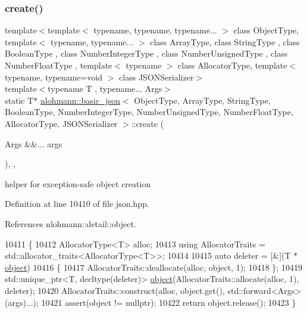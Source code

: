 \subsubsection{\texorpdfstring{create()}{create()}}
{\footnotesize\ttfamily template$<$template$<$ typename, typename, typename... $>$ class Object\+Type, template$<$ typename, typename... $>$ class Array\+Type, class String\+Type , class Boolean\+Type , class Number\+Integer\+Type , class Number\+Unsigned\+Type , class Number\+Float\+Type , template$<$ typename $>$ class Allocator\+Type, template$<$ typename, typename=void $>$ class J\+S\+O\+N\+Serializer$>$ \\
template$<$typename T , typename... Args$>$ \\
static T$\ast$ \hyperlink{classnlohmann_1_1basic__json}{nlohmann\+::basic\+\_\+json}$<$ Object\+Type, Array\+Type, String\+Type, Boolean\+Type, Number\+Integer\+Type, Number\+Unsigned\+Type, Number\+Float\+Type, Allocator\+Type, J\+S\+O\+N\+Serializer $>$\+::create (\begin{DoxyParamCaption}\item[{Args \&\&...}]{args }\end{DoxyParamCaption})\hspace{0.3cm}{\ttfamily [inline]}, {\ttfamily [static]}, {\ttfamily [private]}}



helper for exception-\/safe object creation 



Definition at line 10410 of file json.\+hpp.



References nlohmann\+::detail\+::object.


\begin{DoxyCode}
10411     \{
10412         AllocatorType<T> alloc;
10413         \textcolor{keyword}{using} AllocatorTraits = std::allocator\_traits<AllocatorType<T>>;
10414 
10415         \textcolor{keyword}{auto} deleter = [&](T * \hyperlink{classnlohmann_1_1basic__json_aa13f7c0615867542ce80337cbcf13ada}{object})
10416         \{
10417             AllocatorTraits::deallocate(alloc, \textcolor{keywordtype}{object}, 1);
10418         \};
10419         std::unique\_ptr<T, decltype(deleter)> \hyperlink{classnlohmann_1_1basic__json_aa13f7c0615867542ce80337cbcf13ada}{object}(AllocatorTraits::allocate(alloc, 1), deleter);
10420         AllocatorTraits::construct(alloc, \textcolor{keywordtype}{object}.\textcolor{keyword}{get}(), std::forward<Args>(args)...);
10421         assert(\textcolor{keywordtype}{object} != \textcolor{keyword}{nullptr});
10422         \textcolor{keywordflow}{return} \textcolor{keywordtype}{object}.release();
10423     \}
\end{DoxyCode}
\mbox{\label{classnlohmann_1_1basic__json_a5795b029dbf28e0cb2c7a439ec5d0a88}} 
